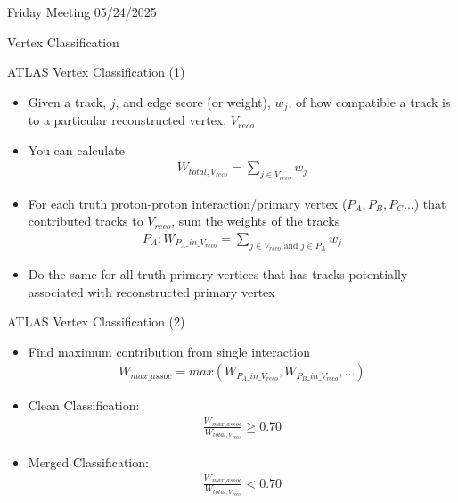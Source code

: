 \documentclass[xcolor=table,aspectratio=169]{beamer}
\begin{document}
\begin{frame}[plain]
    \centering
    Friday Meeting 05/24/2025
\end{frame}

\begin{frame}[plain]
    \centering
    Vertex Classification
\end{frame}

\begin{frame}{ATLAS Vertex Classification (1)}
    \begin{itemize}
        \item Given a track, \(j\), and edge score (or weight), \(w_j\), of how compatible a track is to a particular reconstructed vertex, \(V_{reco}\)
        \item You can calculate
        \begin{align*}
            W_{total, V_{reco}} = \sum_{j \in V_{reco}} w_j
        \end{align*}
        \item For each truth proton-proton interaction/primary vertex (\(P_A, P_B, P_C...\)) that contributed tracks to \(V_{reco}\), sum the weights of the tracks
        \begin{align*}
            P_A: W_{P_A\_in\_V_{reco}} = \sum_{j\in V_{reco} \text{ and } j\in P_A} w_j
        \end{align*}
        \item Do the same for all truth primary vertices that has tracks potentially associated with reconstructed primary vertex
    \end{itemize}
\end{frame}

\begin{frame}{ATLAS Vertex Classification (2)}
    \begin{itemize}
        \item Find maximum contribution from single interaction
        \begin{align*}
            W_{max \_ assoc} = max(W_{P_A\_in\_V_{reco}}, W_{P_B\_in\_V_{reco}}, ...)
        \end{align*}
        \item Clean Classification:
        \begin{align*}
            \frac{W_{max \_ assoc}}{W_{total, V_{reco}}} \geq 0.70
        \end{align*}
        \item Merged Classification:
        \begin{align*}
            \frac{W_{max \_ assoc}}{W_{total, V_{reco}}} < 0.70
        \end{align*}
    \end{itemize}
\end{frame}
\end{document}
